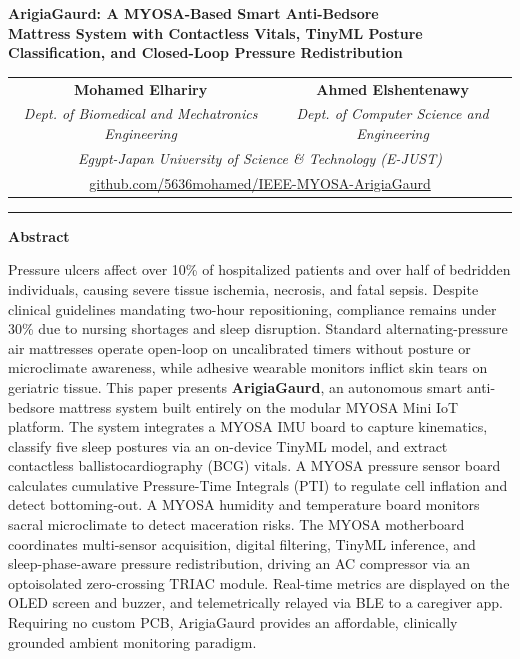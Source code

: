 ﻿\documentclass[11pt,a4paper]{article}
\begin{document}
\begin{center}
    {\LARGE \textbf{ArigiaGaurd: A MYOSA-Based Smart Anti-Bedsore\\Mattress System with Contactless Vitals, TinyML Posture\\Classification, and Closed-Loop Pressure Redistribution}} \par \vspace{0.35em}
    \begin{tabular}{cc}
        \textbf{Mohamed Elhariry} & \textbf{Ahmed Elshentenawy} \\
        {\small \textit{Dept. of Biomedical and Mechatronics Engineering}} & {\small \textit{Dept. of Computer Science and Engineering}} \\
        \multicolumn{2}{c}{\small \textit{Egypt-Japan University of Science \& Technology (E-JUST)}} \\
        \multicolumn{2}{c}{\small \url{github.com/5636mohamed/IEEE-MYOSA-ArigiaGaurd}}
    \end{tabular}
\end{center}

\vspace{0.06em}
\hrule
\vspace{0.08em}
\begin{center}
    \textbf{\large Abstract}
\end{center}
\vspace{-0.45em}

\noindent Pressure ulcers affect over 10\% of hospitalized patients and over half of bedridden individuals, causing severe tissue ischemia, necrosis, and fatal sepsis. Despite clinical guidelines mandating two-hour repositioning, compliance remains under 30\% due to nursing shortages and sleep disruption. Standard alternating-pressure air mattresses operate open-loop on uncalibrated timers without posture or microclimate awareness, while adhesive wearable monitors inflict skin tears on geriatric tissue. This paper presents \textbf{ArigiaGaurd}, an autonomous smart anti-bedsore mattress system built entirely on the modular MYOSA Mini IoT platform. The system integrates a MYOSA IMU board to capture kinematics, classify five sleep postures via an on-device TinyML model, and extract contactless ballistocardiography (BCG) vitals. A MYOSA pressure sensor board calculates cumulative Pressure-Time Integrals (PTI) to regulate cell inflation and detect bottoming-out. A MYOSA humidity and temperature board monitors sacral microclimate to detect maceration risks. The MYOSA motherboard coordinates multi-sensor acquisition, digital filtering, TinyML inference, and sleep-phase-aware pressure redistribution, driving an AC compressor via an optoisolated zero-crossing TRIAC module. Real-time metrics are displayed on the OLED screen and buzzer, and telemetrically relayed via BLE to a caregiver app. Requiring no custom PCB, ArigiaGaurd provides an affordable, clinically grounded ambient monitoring paradigm.
\end{document}
